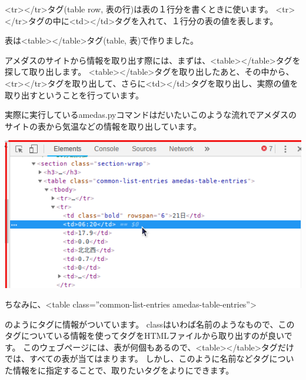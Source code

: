 \documentclass[a4paper,12pt,dvipdfmx]{jarticle}
\begin{document}
{\textless}tr{\textgreater}{\textless}/tr{\textgreater}タグ(table row,
表の行)は表の１行分を書くときに使います。
{\textless}tr{\textgreater}{\textless}/tr{\textgreater}タグの中に{\textless}td{\textgreater}{\textless}/td{\textgreater}タグを入れて、１行分の表の値を表します。


表は{\textless}table{\textgreater}{\textless}/table{\textgreater}タグ(table,
表)で作りました。


アメダスのサイトから情報を取り出す際には、まずは、{\textless}table{\textgreater}{\textless}/table{\textgreater}タグを探して取り出します。
{\textless}table{\textgreater}{\textless}/table{\textgreater}タグを取り出したあと、その中から、{\textless}tr{\textgreater}{\textless}/tr{\textgreater}タグを取り出して、さらに{\textless}td{\textgreater}{\textless}/td{\textgreater}タグを取り出し、実際の値を取り出すということを行っています。


実際に実行しているamedas.pyコマンドはだいたいこのような流れでアメダスのサイトの表から気温などの情報を取り出しています。


\bigskip


\bigskip



\begin{center}
\includegraphics[width=16.178cm]{textbook-img035-3.png}

\end{center}
ちなみに、{\textless}table class=”common-list-entries amedas-table-entries”{\textgreater}

のようにタグに情報がついています。
classはいわば名前のようなもので、このタグについている情報を使ってタグをHTMLファイルから取り出すのが良いです。
このウェブページには、表が何個もあるので、{\textless}table{\textgreater}{\textless}/table{\textgreater}タグだけでは、すべての表が当てはまります。
しかし、このように名前などタグについた情報をに指定することで、取りたいタグをよりにできます。
\end{document}
